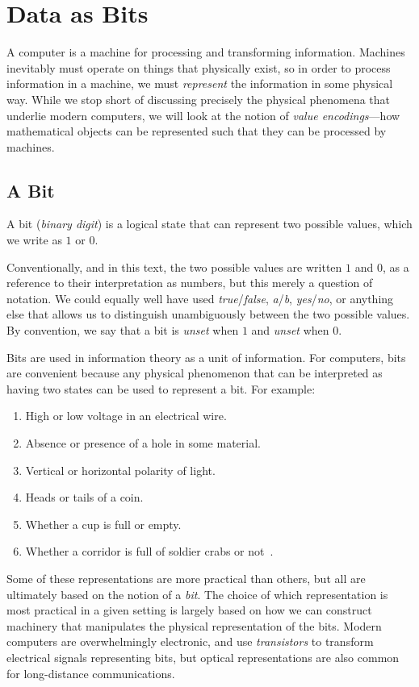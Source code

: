 \chapter{Data as Bits}
\label{chap:bits}

A computer is a machine for processing and transforming information.
Machines inevitably must operate on things that physically exist, so
in order to process information in a machine, we must \emph{represent}
the information in some physical way.  While we stop short of
discussing precisely the physical phenomena that underlie modern
computers, we will look at the notion of \emph{value encodings}---how
mathematical objects can be represented such that they can be
processed by machines.

\section{A Bit}
\label{sec:bit}

\begin{definition}[Bit]
  A bit (\emph{binary digit}) is a logical state that can represent two possible values,
  which we write as $1$ or $0$.
\end{definition}

Conventionally, and in this text, the two possible values are written
$1$ and $0$, as a reference to their interpretation as numbers, but
this merely a question of notation.  We could equally well have used
\emph{true}/\emph{false}, \emph{a}/\emph{b}, \emph{yes}/\emph{no}, or
anything else that allows us to distinguish unambiguously between the
two possible values.  By convention, we say that a bit is \emph{unset}
when $1$ and \emph{unset} when $0$.

Bits are used in information theory as a unit of information.  For
computers, bits are convenient because any physical phenomenon that
can be interpreted as having two states can be used to represent a
bit.  For example:
\begin{enumerate}
\item High or low voltage in an electrical wire.
\item Absence or presence of a hole in some material.
\item Vertical or horizontal polarity of light.
\item Heads or tails of a coin.
\item Whether a cup is full or empty.
\item Whether a corridor is full of soldier crabs or
  not~\cite{gunji2011robust}.
\end{enumerate}
Some of these representations are more practical than others, but all
are ultimately based on the notion of a \emph{bit}.  The choice of
which representation is most practical in a given setting is largely
based on how we can construct machinery that manipulates the physical
representation of the bits.  Modern computers are overwhelmingly
electronic, and use \emph{transistors} to transform electrical signals
representing bits, but optical representations are also common for
long-distance communications.

